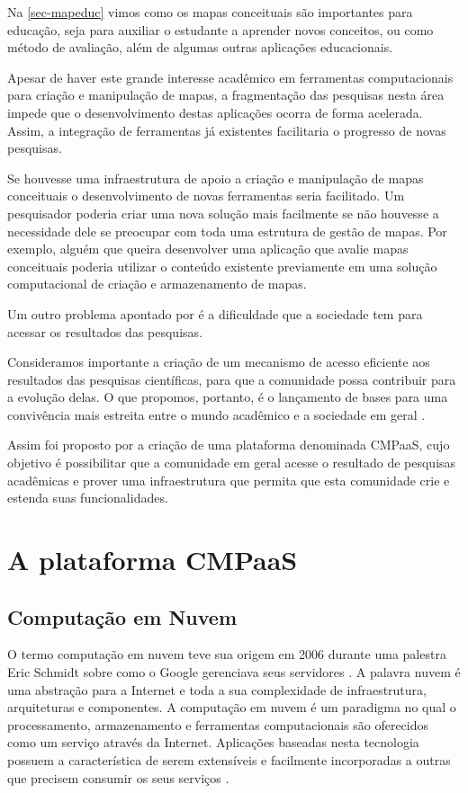 \documentclass[
	12pt,				%
	openright,			%
	oneside,			%
	a4paper,			%
	english,			%
	french,				%
	spanish,			%
	brazil				%
	]{abntex2}
\begin{document}
Na \autoref{sec-mapeduc} vimos como os mapas conceituais são importantes para educação, seja para auxiliar o estudante a aprender novos conceitos, ou como método de avaliação, além de algumas outras aplicações educacionais. 

Apesar de haver este grande interesse acadêmico em ferramentas computacionais para criação e manipulação de mapas, a fragmentação das pesquisas nesta área impede que o desenvolvimento destas aplicações ocorra de forma acelerada. Assim, a integração de ferramentas já existentes facilitaria o progresso de novas pesquisas.

Se houvesse uma infraestrutura de apoio a criação e manipulação de mapas conceituais o desenvolvimento de novas ferramentas seria facilitado. Um pesquisador poderia criar uma nova solução mais facilmente se não houvesse a necessidade dele se preocupar com toda uma estrutura de gestão de mapas. Por exemplo, alguém que queira desenvolver uma aplicação que avalie mapas conceituais poderia utilizar o conteúdo existente previamente em uma solução computacional de criação e armazenamento de mapas.

Um outro problema apontado por  é a dificuldade que a sociedade tem para acessar os resultados das pesquisas.
\begin{citacao}
	Consideramos importante a criação de um mecanismo de
	acesso eficiente aos resultados das pesquisas científicas, para que a comunidade possa contribuir para a evolução delas. O que propomos, portanto, é o lançamento de bases para uma convivência mais estreita entre o mundo acadêmico e a sociedade em geral \cite{Perin2014}.
\end{citacao}

Assim foi proposto por  a criação de uma plataforma denominada CMPaaS, cujo objetivo é possibilitar que a comunidade em geral acesse o resultado de pesquisas acadêmicas e prover uma infraestrutura que permita que esta comunidade crie e estenda suas funcionalidades.

\section{A plataforma CMPaaS}

\subsection{Computação em Nuvem}

O termo computação em nuvem teve sua origem em 2006 durante uma palestra Eric Schmidt sobre como o Google gerenciava seus servidores \cite{taurion2009}. A palavra nuvem é uma abstração para a Internet e toda a sua complexidade de infraestrutura, arquiteturas e componentes. A computação em nuvem é um paradigma no qual o processamento, armazenamento e ferramentas computacionais são oferecidos como um serviço através da Internet. Aplicações baseadas nesta tecnologia possuem a característica de serem extensíveis e facilmente incorporadas a outras que precisem consumir os seus serviços \cite{Perin2014}.
\end{document}

